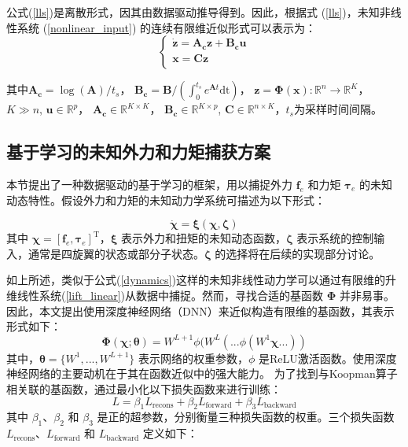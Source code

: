 \documentclass[lang=chs, degree=master, blindreview=false, winfonts=true]{yanputhesis}
\begin{document}
公式(\ref{lls})是离散形式，因其由数据驱动推导得到。因此，根据式 (\ref{lls})，未知非线性系统 (\ref{nonlinear_input}) 的连续有限维近似形式可以表示为： 
\begin{equation}
	\left\{ \begin{array}{c}
		\dot{\bm{z}}=\bm{A_c}\bm{z}+\bm{B_c}\bm{u}\\
		\bm{x}=\bm{Cz}\\
	\end{array} \right. \label{lift_linear}
\end{equation}

其中$\bm{A_c}=\log(\bm{A})/t_s$， $\bm{B_c}=\bm{B}/(\int_{0}^{t_s}e^{\bm{A}t}\text{dt})$， $\bm{z} = \bm{\Phi}(\bm{x}):\mathbb{R}^n \rightarrow \mathbb{R}^K$， $K\gg n$, $\bm{u}\in \mathbb{R}^p$， $\bm{A_c} \in \mathbb{R}^{K\times K}$，  $\bm{B_c} \in \mathbb{R}^{K\times p}$, $\bm{C} \in \mathbb{R}^{n\times K}$，$t_s$为采样时间间隔。





\subsection{基于学习的未知外力和力矩捕获方案}
本节提出了一种数据驱动的基于学习的框架，用以捕捉外力 $\bm{f}_e$ 和力矩 $\bm{\tau}_e$ 的未知动态特性。假设外力和力矩的未知动力学系统可描述为以下形式：

\begin{equation}
	\dot{\bm \chi} = \bm{\xi}(\bm \chi,\bm \zeta) \label{dynamics}
\end{equation}
其中 $\bm \chi = [ \bm f_e, \bm \tau_e]^\mathrm{T}$，$\bm{\xi}$ 表示外力和扭矩的未知动态函数，$\bm{\zeta}$ 表示系统的控制输入，通常是四旋翼的状态或部分子状态。$\bm{\zeta}$ 的选择将在后续的实现部分讨论。

如上所述，类似于公式(\ref{dynamics})这样的未知非线性动力学可以通过有限维的升维线性系统(\ref{lift_linear})从数据中捕捉。然而，寻找合适的基函数 $\bm{\Phi}$ 并非易事。因此，本文提出使用深度神经网络（DNN）来近似构造有限维的基函数，其表示形式如下：
\begin{equation}
	\bm{\Phi}(\bm \chi;\bm{\theta}) = W^{L+1}\phi(W^L(...\phi(W^1 \bm \chi...)) \label{dnn}
\end{equation}
其中，$\bm{\theta} = \{W^1, ..., W^{L+1}\}$ 表示网络的权重参数，$\phi$ 是ReLU激活函数。使用深度神经网络的主要动机在于其在函数近似中的强大能力。
为了找到与Koopman算子相关联的基函数，通过最小化以下损失函数来进行训练：
\begin{equation}
	L = \beta_1 L_{\text{recons}} + \beta_2 L_{\text{forward}} + \beta_3 L_{\text{backward}}
\end{equation}
其中 $\beta_1$、$\beta_2$ 和 $\beta_3$ 是正的超参数，分别衡量三种损失函数的权重。三个损失函数 $L_{\text{recons}}$、$L_{\text{forward}}$ 和 $L_{\text{backward}}$ 定义如下：
\end{document}
